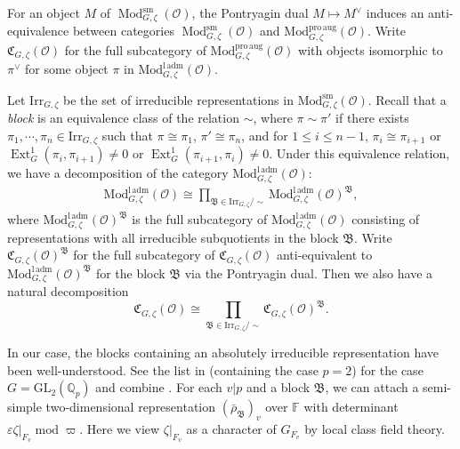 \documentclass[a4paper, 12pt]{amsart}
\DeclareMathOperator{\Ext}{Ext}
\DeclareMathOperator{\modd}{mod}
\def\Irr{\mathrm{Irr}}
\newcommand{\F}{\mathbb{F}}
\newcommand{\Q}{\mathbb{Q}}
\newcommand{\GL}{\mathrm{GL}}
\newcommand{\cO}{\mathcal{O}}
\newcommand{\kC}{\mathfrak{C}}
\newcommand{\kB}{\mathfrak{B}}
\begin{document}
    For an object $M$ of $\operatorname{Mod}^{\mathrm{sm}}_{G, \zeta}(\mathcal{\cO})$, the Pontryagin dual $M \mapsto M^\vee$ induces an anti-equivalence between categories $\operatorname{Mod}^{\mathrm{sm}}_{G, \zeta}(\mathcal{\cO})$ and $\mathrm{Mod}_{G, \zeta}^{\mathrm{pro\,aug}}(\cO)$. Write $\kC_{G,\zeta}(\cO)$ for the full subcategory of $\mathrm{Mod}_{G, \zeta}^{\mathrm{pro\,aug}}(\cO)$ with objects isomorphic to $\pi^\vee$ for some object $\pi$ in $\mathrm{Mod}^{\mathrm{l\, adm}}_{G,\zeta}(\cO)$.
    
    Let $\mathrm{Irr}_{G,\zeta}$ be the set of irreducible representations in $\mathrm{Mod}_{G,\zeta}^{\mathrm{sm}}(\cO)$. Recall that a \textit{block} is an equivalence class of the relation $\sim$, where $\pi \sim \pi'$ if there exists $\pi_1, \cdots, \pi_n \in \Irr_{G, \zeta}$ such that $\pi \cong \pi_1$, $\pi' \cong \pi_n$, and for $1 \leq i \leq n-1$, $\pi_i \cong \pi_{i+1}$ or $\Ext^1_{G}(\pi_i, \pi_{i+1}) \neq 0$ or $\Ext^1_{G}(\pi_{i+1}, \pi_i) \neq 0$.
    Under this equivalence relation, we have a decomposition of the category $\mathrm{Mod}^{\mathrm{l\, adm}}_{G, \zeta} (\cO)$:
    \begin{eqnarray*}
    	\mathrm{Mod}^{\mathrm{l\, adm}}_{G,\zeta}(\cO)\cong \prod_{\mathfrak{B}\in\mathrm{Irr}_{G,\zeta}/\sim}\mathrm{Mod}^{\mathrm{l\, adm}}_{G,\zeta}(\cO)^\kB,
    \end{eqnarray*}
    where $\mathrm{Mod}^{\mathrm{l\, adm}}_{G,\zeta}(\cO)^\kB$ is the full subcategory of $\mathrm{Mod}^{\mathrm{l\, adm}}_{G,\zeta}(\cO)$ consisting of representations with all irreducible subquotients in the block $\kB$. Write $\kC_{G,\zeta}(\cO)^\kB$ for the full subcategory of $\kC_{G,\zeta}(\cO)$ anti-equivalent to $\mathrm{Mod}^{\mathrm{l\, adm}}_{G,\zeta}(\cO)^\kB$ for the block $\kB$ via the Pontryagin dual. Then we also have a natural decomposition \[\kC_{G,\zeta}(\cO)\cong\prod_{\mathfrak{B}\in\mathrm{Irr}_{G,\zeta}/\sim}\kC_{G,\zeta}(\cO)^\kB.\]
    
    In our case, the blocks containing an absolutely irreducible representation have been well-understood. See the list in \cite[Appendix A.2]{Zhang:2024aa} (containing the case $p=2$) for the case $G= \GL_2(\Q_p)$ and combine \cite[Lemma 3.4.7]{pan2022fontaine}. For each $v|p$ and a block $\kB$, we can attach a semi-simple two-dimensional representation $(\bar{\rho}_{\kB})_v$ over $\F$ with determinant $\varepsilon\zeta|_{F_v} \modd \varpi$. Here we view $ \zeta|_{F_v}$ as a character of $ G_{F_v}$ by local class field theory. 
    
\end{document}
